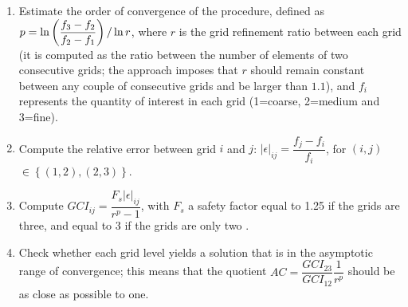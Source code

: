 \begin{enumerate}
	\item  Estimate the order of convergence of the procedure, defined as
	$p = \ln \left( \dfrac{f_3 - f_2}{f_2 - f_1} \right)   / \ln r $,
	where $r$ is the grid refinement ratio between each grid (it is computed as the ratio between the number of elements of two consecutive grids; the approach imposes that $r$ should remain constant between any couple of consecutive grids and be larger than $1.1$), and $f_i$
	represents the quantity of interest in each grid (1=coarse, 2=medium and
	3=fine).
	
	
	\item Compute the relative error between grid $i$ and $j$:
	${|\epsilon|}_{ij} = \dfrac{f_j - f_i}{f_i}$, for $(i,j)$
	$\in \left\{ (1,2), (2,3) \right\}$.
	
	\item Compute
	$ {GCI}_{ij}=\dfrac{F_s {|\epsilon|}_{ij}}{r^p -1}$, with
	$F_s$ a safety factor equal to 1.25 if the grids are three, and equal to 3 if the grids are only two \cite{roache}.
	
	\item Check whether each grid level yields a solution that is in the asymptotic range of convergence; this means that the quotient
	$ AC = \dfrac{{GCI}_{23}}{{GCI}_{12}} \dfrac{1}{r^p}$ should be as close as possible to one.
\end{enumerate}


